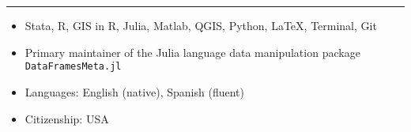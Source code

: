 \documentclass[10.5pt]{article}
\newenvironment{customitemize}
{ \begin{itemize}[leftmargin=\parindent, topsep = 0.2pt, itemsep = -3pt] }
{\end{itemize} }
\begin{document}
\section*{}
\noindent \rule{\textwidth}{1pt} 
\begin{customitemize}
	\item Stata, R, GIS in R, Julia, Matlab, QGIS, Python, LaTeX, Terminal, Git
	\item Primary maintainer of the Julia language data manipulation package \texttt{DataFramesMeta.jl} 
	\item Languages: English (native), Spanish (fluent)
	\item Citizenship: USA
\end{customitemize}

\end{document}
